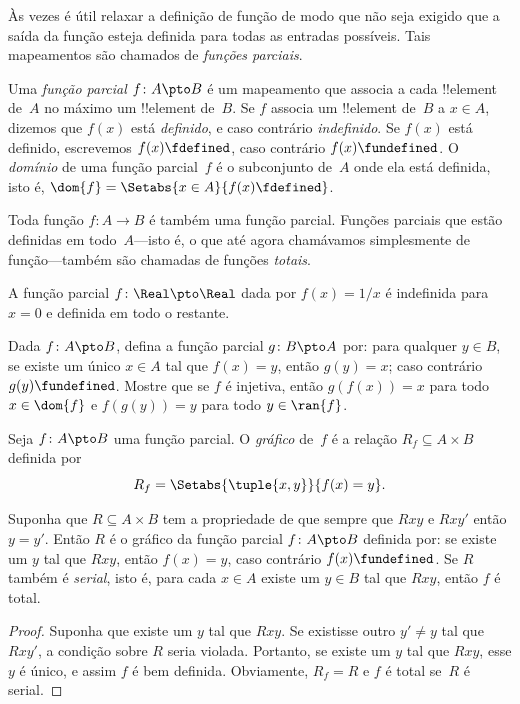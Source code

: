 \documentclass[../../../include/open-logic-section]{subfiles}
\begin{document}


\begin{explain}
Às vezes é útil relaxar a definição de função de modo que não seja
exigido que a saída da função esteja definida para todas as
entradas possíveis. Tais mapeamentos são chamados de \emph{funções parciais}.
\end{explain}

\begin{defn}
Uma \emph{função parcial} $f \colon A \pto B$ é um mapeamento que
associa a cada !!{element} de~$A$ no máximo um !!{element} de~$B$.
Se $f$ associa um !!{element} de~$B$ a $x \in A$, dizemos que $f(x)$ está
\emph{definido}, e caso contrário \emph{indefinido}. Se $f(x)$ está definido,
escrevemos $f(x) \fdefined$, caso contrário $f(x) \fundefined$. O
\emph{domínio} de uma função parcial~$f$ é o subconjunto de~$A$ onde ela
está definida, isto é, $\dom{f} = \Setabs{x \in A}{f(x) \fdefined}$.
\end{defn}

\begin{ex}
Toda função $f\colon A \to B$ é também uma função parcial. Funções parciais
que estão definidas em todo~$A$---isto é, o que até agora
chamávamos simplesmente de função---também são chamadas de funções \emph{totais}.
\end{ex}

\begin{ex}
A função parcial $f \colon \Real \pto \Real$ dada por $f(x) = 1/x$
é indefinida para $x = 0$ e definida em todo o restante.
\end{ex}

\begin{prob}
Dada $f\colon A \pto B$, defina a função parcial $g\colon B \pto
A$ por: para qualquer $y \in B$, se existe um único $x \in A$ tal que
$f(x) = y$, então $g(y) = x$; caso contrário $g(y) \fundefined$.  Mostre que
se $f$ é injetiva, então $g(f(x)) = x$ para todo $x \in \dom{f}$ e
$f(g(y)) = y$ para todo $y \in \ran{f}$.
\end{prob}

\begin{defn}
Seja $f\colon A \pto B$ uma função parcial. O \emph{gráfico} de~$f$
é a relação $R_f \subseteq A \times B$ definida por
\[
R_f = \Setabs{\tuple{x,y}}{f(x) = y}.
\]
\end{defn}

\begin{prop}
Suponha que $R \subseteq A \times B$ tem a propriedade de que sempre que $Rxy$
e $Rxy'$ então $y = y'$.  Então $R$ é o gráfico da função parcial
$f\colon A \pto B$ definida por: se existe um $y$ tal que
$Rxy$, então $f(x) = y$, caso contrário $f(x) \fundefined$.  Se $R$ também é
\emph{serial}, isto é, para cada $x \in A$ existe um $y \in B$ tal que
$Rxy$, então $f$ é total.
\end{prop}

\begin{proof}
Suponha que existe um $y$ tal que $Rxy$.  Se existisse outro $y'
\neq y$ tal que $Rxy'$, a condição sobre $R$ seria
violada. Portanto, se existe um $y$ tal que $Rxy$, esse $y$ é
único, e assim $f$ é bem definida.  Obviamente, $R_f = R$ e $f$ é
total se~$R$ é serial.
\end{proof}
\end{document}
